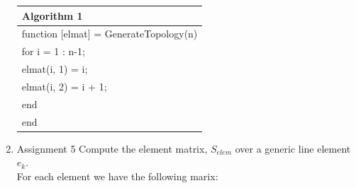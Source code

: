 \documentclass[a4paper,10pt]{report}
\begin{document}
\begin{enumerate}
\begin{table}[!h]
\centering
\begin{tabular}{ |l| } 
\hline
\textbf{Algorithm 1}\\
\hline
\hspace{0.5cm}function [elmat] = GenerateTopology(n)\\
\hspace{0.5cm}for i = 1 : n-1;\\
\hspace{1cm}elmat(i, 1) = i;\\
\hspace{1cm}elmat(i, 2) = i + 1;\\
\hspace{0.5cm}end\\
\hspace{0.5cm}end\\
\hline
\end{tabular}
\end{table}


\item{Assignment 5} Compute the element matrix, $S_{elem}$ over a generic line element $e_k$.\\
For each element we have the following marix:


\end{enumerate}
\end{document}

